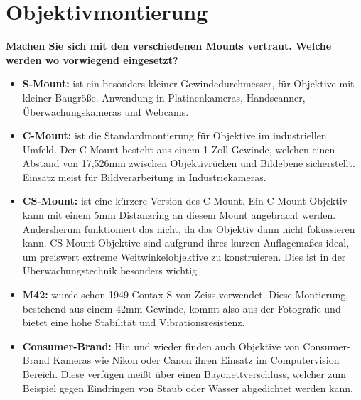 \documentclass[a4paper]{article}
\begin{document}
	\section{Objektivmontierung}
	\textbf{Machen Sie sich mit den verschiedenen Mounts vertraut. Welche werden wo vorwiegend
		eingesetzt?}\\
	\begin{itemize}
		\item \textbf{S-Mount:} ist ein besonders kleiner Gewindedurchmesser, für Objektive mit kleiner Baugröße. Anwendung in Platinenkameras, Handscanner, Überwachungskameras und Webcams.\\
		\item \textbf{C-Mount:} ist die Standardmontierung für Objektive im industriellen Umfeld. Der C-Mount besteht aus einem 1 Zoll Gewinde, welchen einen Abstand von 17,526mm zwischen Objektivrücken und Bildebene sicherstellt. Einsatz meist für Bildverarbeitung in Industriekameras.\\
		\item \textbf{CS-Mount:} ist eine kürzere Version des C-Mount. Ein C-Mount Objektiv kann mit einem 5mm Distanzring an diesem Mount angebracht werden. Andersherum funktioniert das nicht, da das Objektiv dann nicht fokussieren kann. CS-Mount-Objektive sind aufgrund ihres kurzen Auflagemaßes ideal, um preiswert extreme Weitwinkelobjektive zu konstruieren. Dies ist in der Überwachungstechnik besonders wichtig\\
		\item \textbf{M42:} wurde schon 1949 Contax S von Zeiss verwendet. Diese Montierung, bestehend aus einem 42mm Gewinde, kommt also aus der Fotografie und bietet eine hohe Stabilität und Vibrationsresistenz.\\
		\item \textbf{Consumer-Brand:} Hin und wieder finden auch Objektive von Consumer-Brand Kameras wie Nikon oder Canon ihren Einsatz im Computervision Bereich. Diese verfügen meißt über einen Bayonettverschluss, welcher zum Beispiel gegen Eindringen von Staub oder Wasser abgedichtet werden kann.\\
	\end{itemize}
	
\end{document}
